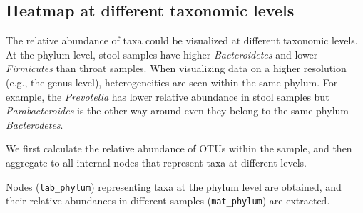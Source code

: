 \documentclass[]{article}
\newcommand{\hlnum}[1]{\textcolor[rgb]{0.816,0.125,0.439}{#1}}%
\newcommand{\hlstr}[1]{\textcolor[rgb]{0.251,0.627,0.251}{#1}}%
\newcommand{\hlcom}[1]{\textcolor[rgb]{0.502,0.502,0.502}{\textit{#1}}}%
\newcommand{\hlopt}[1]{\textcolor[rgb]{0,0,0}{#1}}%
\newcommand{\hlstd}[1]{\textcolor[rgb]{0.251,0.251,0.251}{#1}}%
\newcommand{\hlkwc}[1]{\textcolor[rgb]{0.251,0.251,0.251}{#1}}%
\newcommand{\hlkwd}[1]{\textcolor[rgb]{0.878,0.439,0.125}{#1}}%
\newenvironment{Shaded}{\begin{myshaded}}{\end{myshaded}}
\newcommand{\KeywordTok}[1]{\hlkwd{#1}}
\newcommand{\DataTypeTok}[1]{\hlkwc{#1}}
\newcommand{\DecValTok}[1]{\hlnum{#1}}
\newcommand{\StringTok}[1]{\hlstr{#1}}
\newcommand{\CommentTok}[1]{\hlcom{#1}}
\newcommand{\ControlFlowTok}[1]{\hlkwd{#1}}
\newcommand{\OperatorTok}[1]{\hlopt{#1}}
\newcommand{\NormalTok}[1]{\hlstd{#1}}
\begin{document}
\hypertarget{heatmap-at-different-taxonomic-levels}{%
\subsection{Heatmap at different taxonomic levels}\label{heatmap-at-different-taxonomic-levels}}

The relative abundance of taxa could be visualized at different taxonomic levels. At the phylum level, stool samples have higher \emph{Bacteroidetes} and lower \emph{Firmicutes} than throat samples. When visualizing data on a higher resolution (e.g., the genus level), heterogeneities are seen within the same phylum. For example, the \emph{Prevotella} has lower relative abundance in stool samples but \emph{Parabacteroides} is the other way around even they belong to the same phylum \emph{Bacterodetes}.

We first calculate the relative abundance of OTUs within the sample, and then aggregate to all internal nodes that represent taxa at different levels.

\begin{Shaded}
\end{Shaded}

Nodes (\texttt{lab\_phylum}) representing taxa at the phylum level are obtained, and their relative abundances in different samples (\texttt{mat\_phylum}) are extracted.
\end{document}
